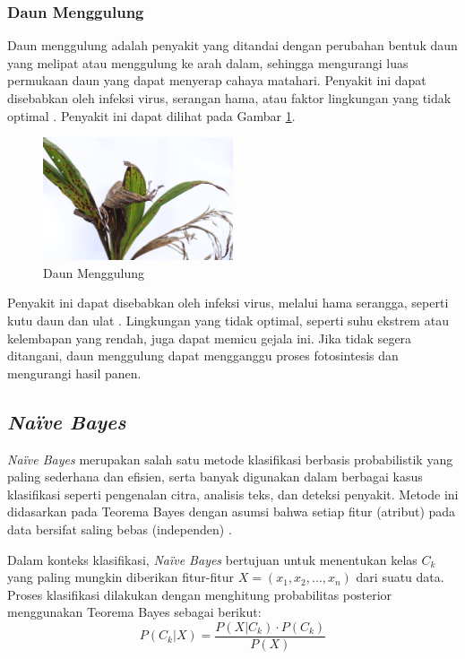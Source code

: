 \subsubsection{Daun Menggulung} \label{II.Daun Menggulung}
Daun menggulung adalah penyakit yang ditandai dengan perubahan bentuk daun yang melipat atau menggulung ke arah dalam, sehingga mengurangi luas permukaan daun yang dapat menyerap cahaya matahari. Penyakit ini dapat disebabkan oleh infeksi virus, serangan hama, atau faktor lingkungan yang tidak optimal \cite{hanik2024identification}\cite{suhesti2022analisis}. Penyakit ini dapat dilihat pada Gambar \ref{fig:2.Daun Menggulung}.

\begin{figure}[H]
	\centering
	\includegraphics[width=0.5\textwidth]{figure/chapter-2-daun-menggulung.jpg}
	\caption{Daun Menggulung}
	\label{fig:2.Daun Menggulung}
\end{figure}

Penyakit ini dapat disebabkan oleh infeksi virus, melalui hama serangga, seperti kutu daun dan ulat \cite{suhesti2022analisis}. Lingkungan yang tidak optimal, seperti suhu ekstrem atau kelembapan yang rendah, juga dapat memicu gejala ini. Jika tidak segera ditangani, daun menggulung dapat mengganggu proses fotosintesis dan mengurangi hasil panen.
\subsection{\textit{Naïve Bayes}}\label{II.NaiveBayes}

\textit{Naïve Bayes} merupakan salah satu metode klasifikasi berbasis probabilistik yang paling sederhana dan efisien, serta banyak digunakan dalam berbagai kasus klasifikasi seperti pengenalan citra, analisis teks, dan deteksi penyakit. Metode ini didasarkan pada Teorema Bayes dengan asumsi bahwa setiap fitur (atribut) pada data bersifat saling bebas (independen) \cite{aziz2024analisis}.

Dalam konteks klasifikasi, \textit{Naïve Bayes} bertujuan untuk menentukan kelas $C_k$ yang paling mungkin diberikan fitur-fitur $X = (x_1, x_2, ..., x_n)$ dari suatu data. Proses klasifikasi dilakukan dengan menghitung probabilitas posterior menggunakan Teorema Bayes sebagai berikut:
\begin{equation}
	P(C_k|X) = \frac{P(X|C_k) \cdot P(C_k)}{P(X)}
	\label{eq:naive_bayes}
\end{equation}

